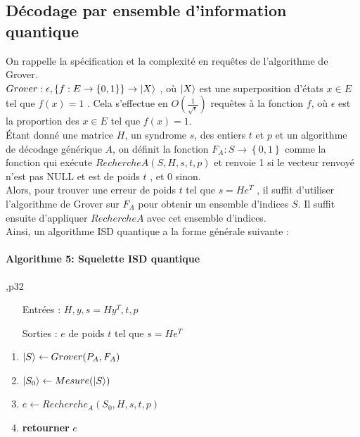 \documentclass[12pt,openany]{report}
\DeclarePairedDelimiter\ket{\lvert}{\rangle}
\begin{document}
\subsection{Décodage par ensemble d'information quantique}

On rappelle la spécification et la complexité en requêtes de l’algorithme de
Grover.\\
$Grover : \epsilon , \left\lbrace f : E \rightarrow  \left\lbrace 0, 1\right\rbrace \right\rbrace  \rightarrow \ket{X}$ , où $\ket{X}$ est une superposition d’états $ x \in  E $
tel que $ f(x) = 1 $ . Cela s’effectue en $ O(\frac{1}{\sqrt{\epsilon}})   $
requêtes à la fonction $f$, où $\epsilon $ est la
proportion des $x \in E $  tel que $ f(x) = 1$.\\
Étant donné une matrice $\mathit{H}$, un syndrome $s$, des entiers $t$ et $p$ et un algorithme
de décodage générique $\mathit{A}$, on définit la fonction $\mathit{F}_A : S \rightarrow \left\lbrace 0, 1\right\rbrace $ comme la
fonction qui exécute  $RechercheA(S, \mathit{H}, s, t, p)$ et renvoie 1 si le vecteur renvoyé
n’est pas NULL et est de poids $t$ , et 0 sinon.\\
Alors, pour trouver une erreur de poids $t$ tel que $s = \mathit{H}e^T$
, il suffit d’utiliser
l’algorithme de Grover sur $\mathit{F}_A$ pour obtenir un ensemble d’indices $S$. Il suffit
ensuite d’appliquer $RechercheA$ avec cet ensemble d’indices.\\
Ainsi, un algorithme ISD quantique a la forme générale suivante :
\begin{flushleft}
\begin{boxedminipage}[ poslb ]{12cm}
\paragraph{Algorithme 5: Squelette ISD quantique }\cite{Ghazal},p32 \\

\begin{itemize}
\item[Entrées] : $ \mathit{H}, y,s=\mathit{H}y^T,t,p $
\item[Sorties] : $e $ de poids $t$ tel que $ s=\mathit{H}e^T $ 
\end{itemize}
\begin{enumerate}
\item $ \ket{S} \leftarrow Grover(P_A,\mathit{F}_A) $
\item $ \ket{S_0} \leftarrow Mesure(\ket{S})       $

\item $ e \leftarrow Recherche_A(S_0,\mathit{H},s,t,p) $
\item \textbf{retourner} $e$
\end{enumerate}
   
\end{boxedminipage}
\end{flushleft}
\end{document}
